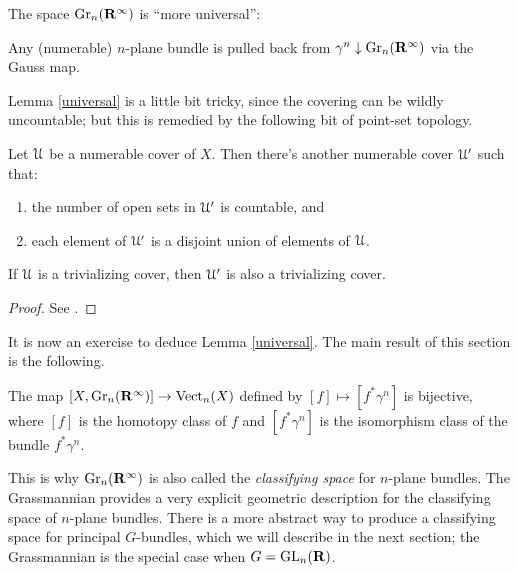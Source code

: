 The space $\mathrm{Gr}_n(\mathbf R^\infty)$ is ``more universal'':
\begin{lemma}\label{universal}
    Any (numerable) $n$-plane bundle is pulled back from $\gamma^n\downarrow
    \mathrm{Gr}_n(\mathbf R^\infty)$ via the Gauss map.
\end{lemma}
Lemma \ref{universal} is a little bit tricky, since the covering can be wildly
uncountable; but this is remedied by the following bit of point-set topology.
\begin{lemma}\label{sublemma}
    Let $\mathcal U$ be a numerable cover of $X$. Then there's another numerable cover
    $\mathcal U^\prime$ such that:
    \begin{enumerate}
	\item the number of open sets in $\mathcal U^\prime$ is countable, and
	\item each element of $\mathcal U^\prime$ is a disjoint union of elements of
	    $\mathcal U$.
    \end{enumerate}
\end{lemma}
If $\mathcal U$ is a trivializing cover, then $\mathcal U^\prime$ is also a trivializing
cover.
\begin{proof}
    See \cite[Proposition 3.5.4]{husemoller}.
\end{proof}
It is now an exercise to deduce Lemma \ref{universal}. The main result of this
section is the following.
\begin{theorem}
    The map $[X,\mathrm{Gr}_n(\mathbf R^\infty)]\to \operatorname{Vect}_n(X)$ defined by $[f]\mapsto
    [f^\ast\gamma^n]$ is bijective, where $[f]$ is the homotopy class of $f$
    and $[f^\ast\gamma^n]$ is the isomorphism class of the bundle
    $f^\ast\gamma^n$.
\end{theorem}
This is why $\mathrm{Gr}_n(\mathbf R^\infty)$ is also called the \emph{classifying space}
for $n$-plane bundles. The Grassmannian provides a very explicit geometric
description for the classifying space of $n$-plane bundles. There is a more
abstract way to produce a classifying space for principal $G$-bundles, which
we will describe in the next section; the Grassmannian is the special case when
$G = \mathrm{GL}_n(\mathbf R)$.
